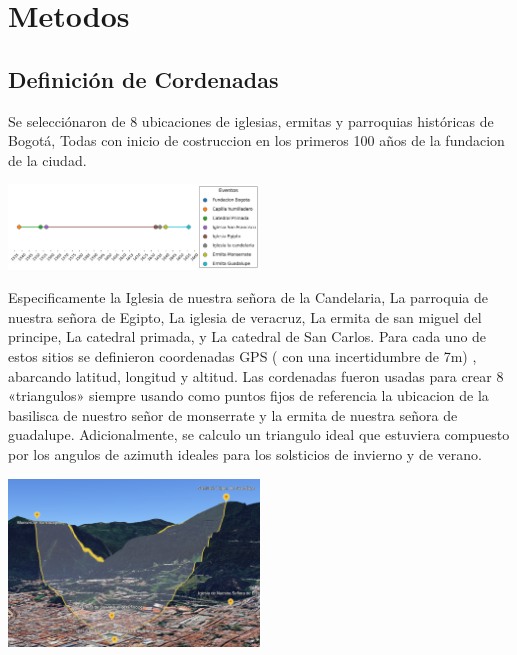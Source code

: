 \documentclass[a4paper,alpha-refs]{eSpectra}
\begin{document}
\vspace{-\baselineskip}  %
\justifying
\section{Metodos}

\subsection{Definición de Cordenadas}
\justifying
Se selecciónaron de 8 ubicaciones  de iglesias, ermitas y parroquias  históricas de Bogotá, Todas con inicio de costruccion en los primeros 100 años de la fundacion de la ciudad.

\centering
   \includegraphics[width=0.5\textwidth]{images/timeline_events.png}

\justifying
Especificamente  la Iglesia de nuestra señora de la Candelaria, La parroquia de nuestra señora de Egipto, La iglesia de veracruz, La ermita de san miguel del principe, La catedral primada, y La catedral de San Carlos. 
Para cada uno de estos sitios se definieron coordenadas  GPS ( con una incertidumbre de 7m) , abarcando latitud, longitud y altitud. Las cordenadas fueron usadas para crear 8 «triangulos» siempre usando como puntos fijos de referencia la ubicacion de la basilisca de nuestro señor de monserrate y la ermita de nuestra señora de guadalupe. Adicionalmente, se calculo un triangulo ideal que estuviera compuesto por los angulos de azimuth ideales para los solsticios de invierno y de verano.

\centering
   \includegraphics[width=0.5\textwidth]{images/Pasted image 20250617164513.png}
\justifying
\end{document}
